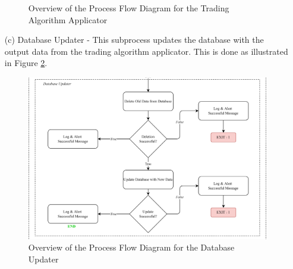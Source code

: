 \begin{itemize}
\begin{figure}[ht]
        \caption{Overview of the Process Flow Diagram for the Trading Algorithm Applicator}
        \label{fig:process_flowchart_dp_trad_algo_applicator}
    \end{figure}
    \FloatBarrier
    \item[(c)] Database Updater - This subprocess updates the database with the output data from
    the trading algorithm applicator. This is done as illustrated in Figure \ref{fig:process_flowchart_db_updater}.
    \begin{figure}[ht]
        \centering
        \includegraphics[width=1\textwidth]{./assets/Chapter_3/PFC/ProcessFlowchart_DataProcessor3.png}
        \caption{Overview of the Process Flow Diagram for the Database Updater}
        \label{fig:process_flowchart_db_updater}
    \end{figure}
    \FloatBarrier
\end{itemize}
